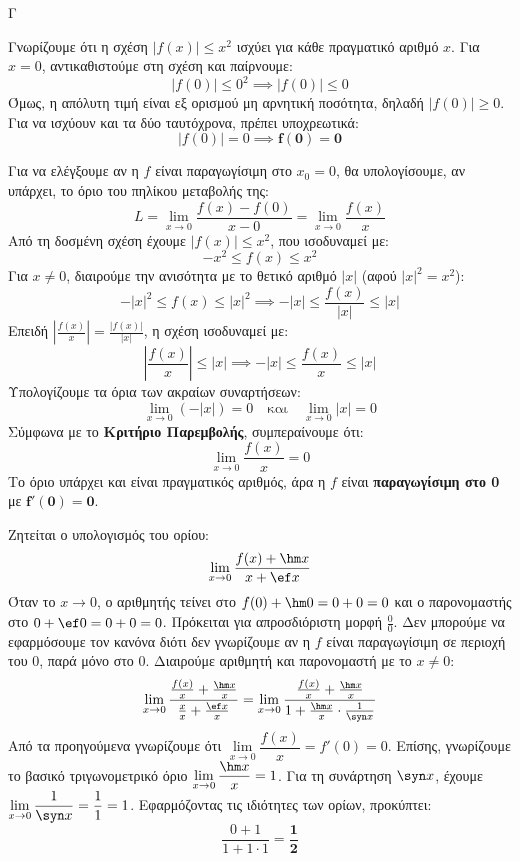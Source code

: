 \begin{thema}{Γ}
\begin{erwthma}
\item Γνωρίζουμε ότι η σχέση $|f(x)| \le x^2$ ισχύει για κάθε πραγματικό αριθμό $x$.
Για $x = 0$, αντικαθιστούμε στη σχέση και παίρνουμε:
\[ |f(0)| \le 0^2 \implies |f(0)| \le 0 \]
Όμως, η απόλυτη τιμή είναι εξ ορισμού μη αρνητική ποσότητα, δηλαδή $|f(0)| \ge 0$.
Για να ισχύουν και τα δύο ταυτόχρονα, πρέπει υποχρεωτικά:
\[ |f(0)| = 0 \implies \boldsymbol{f(0) = 0} \]

\item Για να ελέγξουμε αν η $f$ είναι παραγωγίσιμη στο $x_0 = 0$, θα υπολογίσουμε, αν υπάρχει, το όριο του πηλίκου μεταβολής της:
\[ L = \lim_{x \to 0} \frac{f(x) - f(0)}{x - 0} = \lim_{x \to 0} \frac{f(x)}{x} \]
Από τη δοσμένη σχέση έχουμε $|f(x)| \le x^2$, που ισοδυναμεί με:
\[ -x^2 \le f(x) \le x^2 \]
Για $x \neq 0$, διαιρούμε την ανισότητα με το θετικό αριθμό $|x|$ (αφού $|x|^2 = x^2$):
\[ -|x|^2 \le f(x) \le |x|^2 \implies -|x| \le \frac{f(x)}{|x|} \le |x| \]
Επειδή $\left| \frac{f(x)}{x} \right| = \frac{|f(x)|}{|x|}$, η σχέση ισοδυναμεί με:
\[ \left| \frac{f(x)}{x} \right| \le |x| \implies -|x| \le \frac{f(x)}{x} \le |x| \]
Υπολογίζουμε τα όρια των ακραίων συναρτήσεων:
\[ \lim_{x \to 0} (-|x|) = 0 \quad \text{και} \quad \lim_{x \to 0} |x| = 0 \]
Σύμφωνα με το \textbf{Κριτήριο Παρεμβολής}, συμπεραίνουμε ότι:
\[ \lim_{x \to 0} \frac{f(x)}{x} = 0 \]
Το όριο υπάρχει και είναι πραγματικός αριθμός, άρα η $f$ είναι \textbf{παραγωγίσιμη στο 0} με $\boldsymbol{f'(0) = 0}$.

\item Ζητείται ο υπολογισμός του ορίου:
\[ \lim_{x \to 0} \frac{f(x) + \hm x}{x + \ef x} \]
Όταν το $x \to 0$, ο αριθμητής τείνει στο $f(0) + \hm 0 = 0+0=0$ και ο παρονομαστής στο $0 + \ef 0 = 0+0=0$. 
Πρόκειται για απροσδιόριστη μορφή $\frac{0}{0}$. Δεν μπορούμε να εφαρμόσουμε τον κανόνα  διότι δεν γνωρίζουμε αν η $f$ είναι παραγωγίσιμη σε περιοχή του 0, παρά μόνο στο 0.
Διαιρούμε αριθμητή και παρονομαστή με το $x \neq 0$:
\[ \lim_{x \to 0} \frac{\frac{f(x)}{x} + \frac{\hm x}{x}}{\frac{x}{x} + \frac{\ef x}{x}} = \lim_{x \to 0} \frac{\frac{f(x)}{x} + \frac{\hm x}{x}}{1 + \frac{\hm x}{x} \cdot \frac{1}{\syn x}} \]
Από τα προηγούμενα γνωρίζουμε ότι $\lim\limits_{x \to 0} \dfrac{f(x)}{x} = f'(0) = 0$. 
Επίσης, γνωρίζουμε το βασικό τριγωνομετρικό όριο $\lim\limits_{x \to 0} \dfrac{\hm x}{x} = 1$.
Για τη συνάρτηση $\syn x$, έχουμε $\lim\limits_{x \to 0} \dfrac{1}{\syn x} = \dfrac{1}{1} = 1$.
Εφαρμόζοντας τις ιδιότητες των ορίων, προκύπτει:
\[ \frac{0 + 1}{1 + 1 \cdot 1} = \boldsymbol{\frac{1}{2}} \]


\end{erwthma}
\end{thema}
